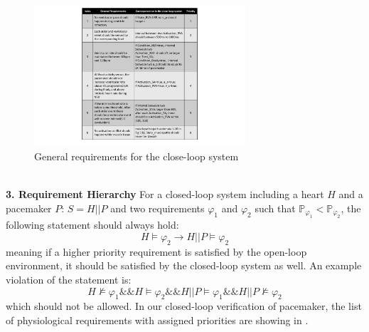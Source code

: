 \begin{figure}
	\center
	\includegraphics[width=0.7\textwidth]{figs/properties.pdf}
	\center
	\vspace{-10pt}
	\caption{General requirements for the close-loop system}
	\label{fig:properties}
\end{figure}
\noindent
\\\textbf{3. Requirement Hierarchy}
For a closed-loop system including a heart $H$ and a pacemaker $P$: $S=H || P$ and two requirements $\varphi_1$ and $\varphi_2$ such that $\mathbb{P}_{\varphi_1}<\mathbb{P}_{\varphi_2}$, the following statement should always hold:
\vspace{-5pt}
$$H\models\varphi_2\rightarrow H||P\models\varphi_2$$
\noindent
meaning if a higher priority requirement is satisfied by the open-loop environment, it should be satisfied by the closed-loop system as well. An example violation of the statement is:
$$H\not\models\varphi_1 \&\& H\models\varphi_2 \&\& H||P\models\varphi_1 \&\& H||P\not\models\varphi_2$$
\noindent
which should not be allowed. In our closed-loop verification of pacemaker, the list of physiological requirements with assigned priorities are showing in .





